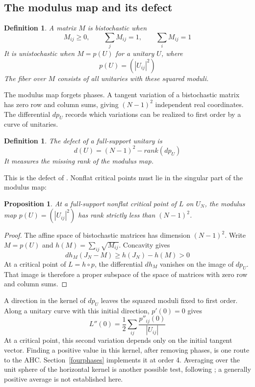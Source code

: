 \documentclass[11pt,a4paper]{article}
\newtheorem{prop}[thm]{Proposition}
\newtheorem{defn}[thm]{Definition}
\begin{document}
\subsection{The modulus map and its defect}
\begin{defn}
A matrix $M$ is bistochastic when
\[
 M_{ij}\ge0,\qquad \sum_jM_{ij}=1,\qquad\sum_iM_{ij}=1
\]
It is unistochastic when $M=p(U)$ for a unitary $U$, where
\[
 p(U)=(|U_{ij}|^2)
\]
The fiber over $M$ consists of all unitaries with these squared moduli.
\end{defn}

The modulus map forgets phases. A tangent variation of a bistochastic
matrix has zero row and column sums, giving $(N-1)^2$ independent real
coordinates. The differential $dp_U$ records which variations can be
realized to first order by a curve of unitaries.

\begin{defn}
The defect of a full-support unitary is
\[
 d(U)=(N-1)^2-rank(dp_U)
\]
It measures the missing rank of the modulus map.
\end{defn}

This is the defect of \cite{TZ}. Nonflat critical points must lie in
the singular part of the modulus map:

\begin{prop}\label{defect}
At a full-support nonflat critical point of $L$ on $U_N$, the modulus
map $p(U)=(|U_{ij}|^2)$ has rank strictly less than $(N-1)^2$.
\end{prop}
\begin{proof}
The affine space of bistochastic matrices has dimension $(N-1)^2$.
Write $M=p(U)$ and $h(M)=\sum_{ij}\sqrt{M_{ij}}$. Concavity gives
\[
 dh_M(J_N-M)\ge h(J_N)-h(M)>0
\]
At a critical point of $L=h\circ p$, the differential $dh_M$ vanishes
on the image of $dp_U$. That image is therefore a proper subspace of
the space of matrices with zero row and column sums.
\end{proof}

A direction in the kernel of $dp_U$ leaves the squared moduli fixed to
first order. Along a unitary curve with this initial direction,
$p'(0)=0$ gives
\[
 L''(0)=\frac12\sum_{ij}\frac{p''_{ij}(0)}{|U_{ij}|}
\]
At a critical point, this second variation depends only on the initial tangent vector.
Finding a positive value in this kernel, after removing phases, is one
route to the AHC. Section~\ref{fourphases} implements it at order 4.
Averaging over the unit sphere of the horizontal kernel is another
possible test, following \cite{BN}; a generally positive average is not
established here.
\end{document}

